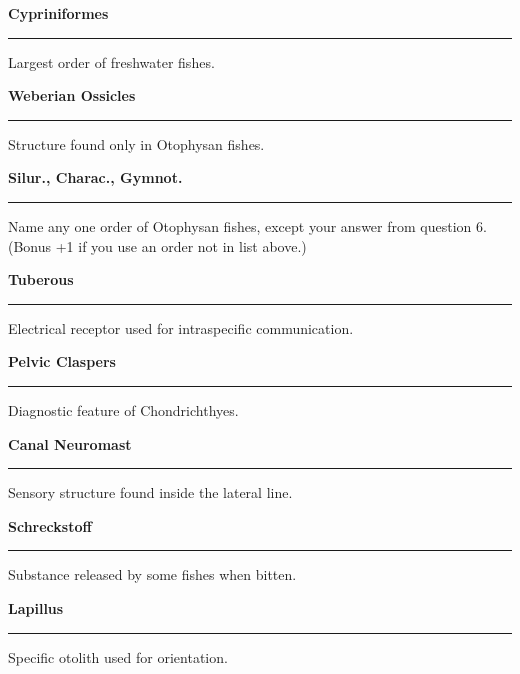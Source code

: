 \documentclass[11pt, addpoints]{exam}
\newcommand*\Matching[1]{
\ifprintanswers
	\textbf{#1}
\else
	\rule{2.1in}{0.5pt}
\fi
}
\newlength\matchlena
\newlength\matchlenb
\newcommand\MatchQuestion[2]{%
	\setlength\matchlenb{\linewidth}
	\addtolength\matchlenb{-\matchlena}
	\parbox[t]{\matchlena}{\Matching{#1}}\enspace\parbox[t]{\matchlenb}{#2}}
\begin{document}
\begin{questions}
\vspace{-1\baselineskip}
\fullwidth{%

}
\vspace{0.4\baselineskip}

\question\MatchQuestion{Cypriniformes}{Largest order of freshwater fishes.}
\vspace{0.4\baselineskip}

\question\MatchQuestion{Weberian Ossicles}{Structure found only in Otophysan fishes.}
\vspace{0.4\baselineskip}

\question\MatchQuestion{{\small Silur., Charac., Gymnot.}}{Name any one order of Otophysan fishes, except your answer from question 6. (Bonus +1 if you use an order not in list above.)}
\vspace{0.4\baselineskip}

\question\MatchQuestion{Tuberous}{Electrical receptor used for intraspecific communication.}
\vspace{0.4\baselineskip}

\question\MatchQuestion{Pelvic Claspers}{Diagnostic feature of Chondrichthyes.}
\vspace{0.4\baselineskip}

\question\MatchQuestion{Canal Neuromast}{Sensory structure found inside the lateral line.}
\vspace{0.4\baselineskip}

\question\MatchQuestion{Schreckstoff}{Substance released by some fishes when bitten.}
\vspace{0.4\baselineskip}


\question\MatchQuestion{Lapillus}{Specific otolith used for orientation.}
\vspace{0.4\baselineskip}


\vspace{1\baselineskip}


\end{questions}
\end{document}
